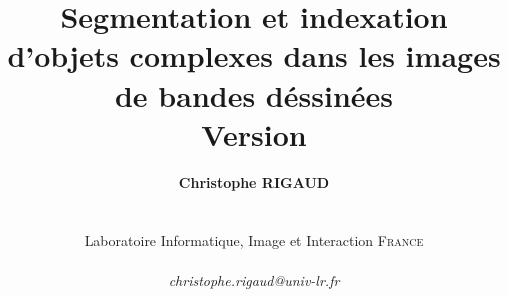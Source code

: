 \documentclass[a4paper,14pt]{book}
\begin{document}
\shorthandoff{:}
\author{
\textbf{Christophe RIGAUD}\\
~\\ ~\\
Laboratoire Informatique, Image et Interaction \textsc{France}\\
~\\
\textit{christophe.rigaud@univ-lr.fr}\\
}

\title{
\textbf{\huge Segmentation et indexation d'objets complexes dans les images de bandes d{\'e}ssin{\'e}es}
\\
Version 
}


\thispagestyle{empty}

\pagestyle{fancy}





\newpage
\thispagestyle{empty}
\newpage $\ $
\newpage
\thispagestyle{empty}

\end{document}
